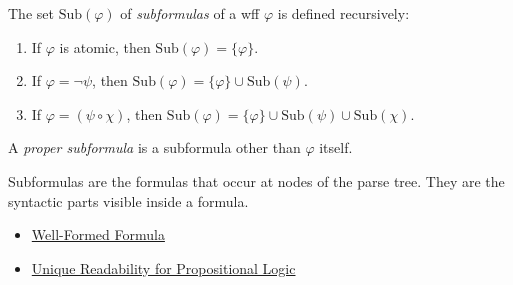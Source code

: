 \begin{tcolorbox}[colback=propbox, colframe=propborder, arc=2pt,
  left=6pt, right=6pt, top=4pt, bottom=4pt,
  title={\small\textbf{Definition (Subformula)}},
  fonttitle=\small\bfseries]
\label{def:subformula}
The set $\mathrm{Sub}(\varphi)$ of \emph{subformulas} of a wff $\varphi$ is
defined recursively:
\begin{enumerate}
  \item If $\varphi$ is atomic, then
        $\mathrm{Sub}(\varphi)=\{\varphi\}$.
  \item If $\varphi=\neg\psi$, then
        $\mathrm{Sub}(\varphi)=\{\varphi\}\cup\mathrm{Sub}(\psi)$.
  \item If $\varphi=(\psi\circ\chi)$, then
        $\mathrm{Sub}(\varphi)
        =\{\varphi\}\cup\mathrm{Sub}(\psi)\cup\mathrm{Sub}(\chi)$.
\end{enumerate}
A \emph{proper subformula} is a subformula other than $\varphi$ itself.
\end{tcolorbox}

\begin{remark*}[Interpretation]
Subformulas are the formulas that occur at nodes of the parse tree. They are the
syntactic parts visible inside a formula.
\end{remark*}

\begin{dependencies}
\begin{itemize}
  \item \hyperref[def:well-formed-formula]{Well-Formed Formula}
  \item \hyperref[thm:unique-readability-propositional-logic]{Unique Readability for Propositional Logic}
\end{itemize}
\end{dependencies}
